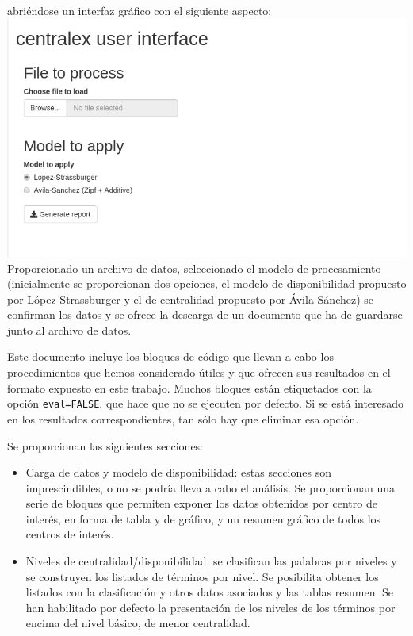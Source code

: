 \documentclass[
]{article}
\providecommand{\tightlist}{%
  \setlength{\itemsep}{0pt}\setlength{\parskip}{0pt}}
\begin{document}
abriéndose un interfaz gráfico con el siguiente aspecto:
\includegraphics{imgs/dispocen01.png} Proporcionado un archivo de datos,
seleccionado el modelo de procesamiento (inicialmente se proporcionan
dos opciones, el modelo de disponibilidad propuesto por
López-Strassburger y el de centralidad propuesto por Ávila-Sánchez) se
confirman los datos y se ofrece la descarga de un documento que ha de
guardarse junto al archivo de datos.

Este documento incluye los bloques de código que llevan a cabo los
procedimientos que hemos considerado útiles y que ofrecen sus resultados
en el formato expuesto en este trabajo. Muchos bloques están etiquetados
con la opción \texttt{eval=FALSE}, que hace que no se ejecuten por
defecto. Si se está interesado en los resultados correspondientes, tan
sólo hay que eliminar esa opción.

Se proporcionan las siguientes secciones:

\begin{itemize}
\tightlist
\item
  Carga de datos y modelo de disponibilidad: estas secciones son
  imprescindibles, o no se podría lleva a cabo el análisis. Se
  proporcionan una serie de bloques que permiten exponer los datos
  obtenidos por centro de interés, en forma de tabla y de gráfico, y un
  resumen gráfico de todos los centros de interés.
\item
  Niveles de centralidad/disponibilidad: se clasifican las palabras por
  niveles y se construyen los listados de términos por nivel. Se
  posibilita obtener los listados con la clasificación y otros datos
  asociados y las tablas resumen. Se han habilitado por defecto la
  presentación de los niveles de los términos por encima del nivel
  básico, de menor centralidad.
\end{itemize}
\end{document}
